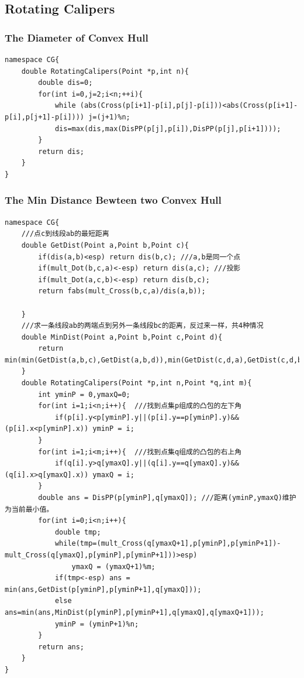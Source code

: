 \documentclass[10pt]{ctexart}
\begin{document}
{{\subsection{Rotating Calipers}
\subsubsection{The Diameter of Convex Hull}
\begin{lstlisting}
namespace CG{
    double RotatingCalipers(Point *p,int n){
        double dis=0;
        for(int i=0,j=2;i<n;++i){
            while (abs(Cross(p[i+1]-p[i],p[j]-p[i]))<abs(Cross(p[i+1]-p[i],p[j+1]-p[i]))) j=(j+1)%n;
            dis=max(dis,max(DisPP(p[j],p[i]),DisPP(p[j],p[i+1])));
        }
        return dis;
    }
}
\end{lstlisting}
\subsubsection{The Min Distance Bewteen two Convex Hull}
\begin{lstlisting}
namespace CG{
    ///点c到线段ab的最短距离
    double GetDist(Point a,Point b,Point c){
        if(dis(a,b)<esp) return dis(b,c); ///a,b是同一个点
        if(mult_Dot(b,c,a)<-esp) return dis(a,c); ///投影
        if(mult_Dot(a,c,b)<-esp) return dis(b,c);
        return fabs(mult_Cross(b,c,a)/dis(a,b));

    }
    ///求一条线段ab的两端点到另外一条线段bc的距离，反过来一样，共4种情况
    double MinDist(Point a,Point b,Point c,Point d){
        return min(min(GetDist(a,b,c),GetDist(a,b,d)),min(GetDist(c,d,a),GetDist(c,d,b)));
    }
    double RotatingCalipers(Point *p,int n,Point *q,int m){
        int yminP = 0,ymaxQ=0;
        for(int i=1;i<n;i++){  ///找到点集p组成的凸包的左下角
            if(p[i].y<p[yminP].y||(p[i].y==p[yminP].y)&&(p[i].x<p[yminP].x)) yminP = i;
        }
        for(int i=1;i<m;i++){  ///找到点集q组成的凸包的右上角
            if(q[i].y>q[ymaxQ].y||(q[i].y==q[ymaxQ].y)&&(q[i].x>q[ymaxQ].x)) ymaxQ = i;
        }
        double ans = DisPP(p[yminP],q[ymaxQ]); ///距离(yminP,ymaxQ)维护为当前最小值。
        for(int i=0;i<n;i++){
            double tmp;
            while(tmp=(mult_Cross(q[ymaxQ+1],p[yminP],p[yminP+1])-mult_Cross(q[ymaxQ],p[yminP],p[yminP+1]))>esp)
                ymaxQ = (ymaxQ+1)%m;
            if(tmp<-esp) ans = min(ans,GetDist(p[yminP],p[yminP+1],q[ymaxQ]));
            else ans=min(ans,MinDist(p[yminP],p[yminP+1],q[ymaxQ],q[ymaxQ+1]));
            yminP = (yminP+1)%n;
        }
        return ans;
    }
}
\end{lstlisting}
}}
\end{document}
